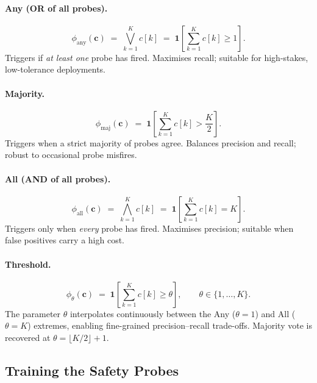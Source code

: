 \documentclass{article}
\begin{document}
\paragraph{Any (OR of all probes).}
\begin{equation}
  \phi_{\mathrm{any}}(\mathbf{c})
  \;=\; \bigvee_{k=1}^{K} c[k]
  \;=\; \mathbf{1}\!\left[\sum_{k=1}^{K} c[k] \geq 1\right].
  \label{eq:phi-any}
\end{equation}
Triggers if \emph{at least one} probe has fired.  Maximises recall; suitable for
high-stakes, low-tolerance deployments.

\paragraph{Majority.}
\begin{equation}
  \phi_{\mathrm{maj}}(\mathbf{c})
  \;=\; \mathbf{1}\!\left[\sum_{k=1}^{K} c[k] > \frac{K}{2}\right].
  \label{eq:phi-majority}
\end{equation}
Triggers when a strict majority of probes agree.  Balances precision and recall;
robust to occasional probe misfires.

\paragraph{All (AND of all probes).}
\begin{equation}
  \phi_{\mathrm{all}}(\mathbf{c})
  \;=\; \bigwedge_{k=1}^{K} c[k]
  \;=\; \mathbf{1}\!\left[\sum_{k=1}^{K} c[k] = K\right].
  \label{eq:phi-all}
\end{equation}
Triggers only when \emph{every} probe has fired.  Maximises precision; suitable
when false positives carry a high cost.

\paragraph{Threshold.}
\begin{equation}
  \phi_{\theta}(\mathbf{c})
  \;=\; \mathbf{1}\!\left[\sum_{k=1}^{K} c[k] \geq \theta\right],
  \qquad \theta \in \{1,\ldots,K\}.
  \label{eq:phi-threshold}
\end{equation}
The parameter $\theta$ interpolates continuously between the Any
($\theta = 1$) and All ($\theta = K$) extremes, enabling fine-grained
precision--recall trade-offs.  Majority vote is recovered at
$\theta = \lfloor K/2 \rfloor + 1$.

\subsection{Training the Safety Probes}
\label{sec:mbca:training}
\end{document}

